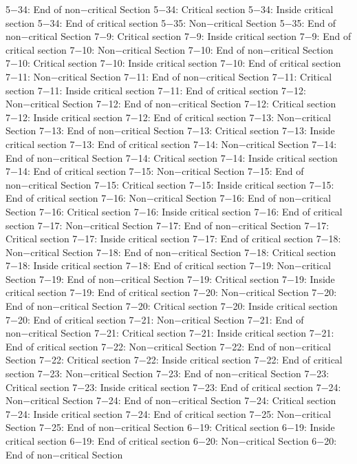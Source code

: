 5−34: End of non−critical Section
5−34: Critical section
5−34: Inside critical section
5−34: End of critical section
5−35: Non−critical Section
5−35: End of non−critical Section
7−9: Critical section
7−9: Inside critical section
7−9: End of critical section
7−10: Non−critical Section
7−10: End of non−critical Section
7−10: Critical section
7−10: Inside critical section
7−10: End of critical section
7−11: Non−critical Section
7−11: End of non−critical Section
7−11: Critical section
7−11: Inside critical section
7−11: End of critical section
7−12: Non−critical Section
7−12: End of non−critical Section
7−12: Critical section
7−12: Inside critical section
7−12: End of critical section
7−13: Non−critical Section
7−13: End of non−critical Section
7−13: Critical section
7−13: Inside critical section
7−13: End of critical section
7−14: Non−critical Section
7−14: End of non−critical Section
7−14: Critical section
7−14: Inside critical section
7−14: End of critical section
7−15: Non−critical Section
7−15: End of non−critical Section
7−15: Critical section
7−15: Inside critical section
7−15: End of critical section
7−16: Non−critical Section
7−16: End of non−critical Section
7−16: Critical section
7−16: Inside critical section
7−16: End of critical section
7−17: Non−critical Section
7−17: End of non−critical Section
7−17: Critical section
7−17: Inside critical section
7−17: End of critical section
7−18: Non−critical Section
7−18: End of non−critical Section
7−18: Critical section
7−18: Inside critical section
7−18: End of critical section
7−19: Non−critical Section
7−19: End of non−critical Section
7−19: Critical section
7−19: Inside critical section
7−19: End of critical section
7−20: Non−critical Section
7−20: End of non−critical Section
7−20: Critical section
7−20: Inside critical section
7−20: End of critical section
7−21: Non−critical Section
7−21: End of non−critical Section
7−21: Critical section
7−21: Inside critical section
7−21: End of critical section
7−22: Non−critical Section
7−22: End of non−critical Section
7−22: Critical section
7−22: Inside critical section
7−22: End of critical section
7−23: Non−critical Section
7−23: End of non−critical Section
7−23: Critical section
7−23: Inside critical section
7−23: End of critical section
7−24: Non−critical Section
7−24: End of non−critical Section
7−24: Critical section
7−24: Inside critical section
7−24: End of critical section
7−25: Non−critical Section
7−25: End of non−critical Section
6−19: Critical section
6−19: Inside critical section
6−19: End of critical section
6−20: Non−critical Section
6−20: End of non−critical Section
